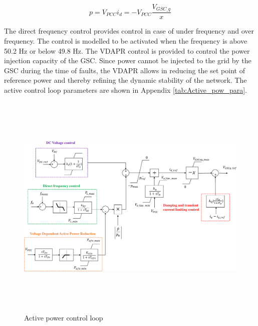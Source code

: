 \begin{equation}\label{P_eq}
    p = V_{PCC}i_d = -V_{PCC}\frac{V_{GSC\_q}}{x}
\end{equation}

The direct frequency control provides control in case of under frequency and over frequency. The control is modelled to be activated when the frequency is above 50.2 Hz or below 49.8 Hz.
The \gls{VDAPR} control is provided to control the power injection capacity of the \gls{GSC}. Since power cannot be injected to the grid by the \gls{GSC} during the time of faults, the \gls{VDAPR} allows in reducing the set point of reference power and thereby refining the dynamic stability of the network. The active control loop parameters are shown in Appendix \ref{tab:Active_pow_para}.

\begin{figure}[H]
\centering
    \includegraphics[height = 11cm,width = \textwidth]{Diagrams/Chapter_3/Active_power_loop.pdf}
    \caption{Active power control loop \cite{korai_dynamic_2019}}
    \label{fig:Active_Power_Control_Loop}
\end{figure}

